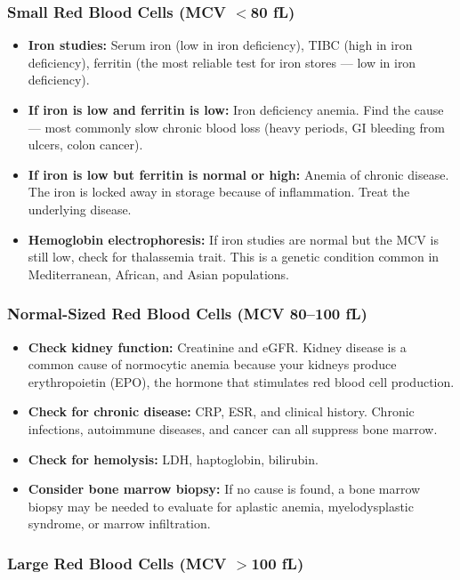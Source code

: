 \subsubsection{Small Red Blood Cells (MCV $<$80 fL)}

\begin{itemize}
    \item \textbf{Iron studies:} Serum iron (low in iron deficiency), TIBC (high in iron deficiency), ferritin (the most reliable test for iron stores --- low in iron deficiency).
    \item \textbf{If iron is low and ferritin is low:} Iron deficiency anemia. Find the cause --- most commonly slow chronic blood loss (heavy periods, GI bleeding from ulcers, colon cancer).
    \item \textbf{If iron is low but ferritin is normal or high:} Anemia of chronic disease. The iron is locked away in storage because of inflammation. Treat the underlying disease.
    \item \textbf{Hemoglobin electrophoresis:} If iron studies are normal but the MCV is still low, check for thalassemia trait. This is a genetic condition common in Mediterranean, African, and Asian populations.
\end{itemize}

\subsubsection{Normal-Sized Red Blood Cells (MCV 80--100 fL)}

\begin{itemize}
    \item \textbf{Check kidney function:} Creatinine and eGFR. Kidney disease is a common cause of normocytic anemia because your kidneys produce erythropoietin (EPO), the hormone that stimulates red blood cell production.
    \item \textbf{Check for chronic disease:} CRP, ESR, and clinical history. Chronic infections, autoimmune diseases, and cancer can all suppress bone marrow.
    \item \textbf{Check for hemolysis:} LDH, haptoglobin, bilirubin.
    \item \textbf{Consider bone marrow biopsy:} If no cause is found, a bone marrow biopsy may be needed to evaluate for aplastic anemia, myelodysplastic syndrome, or marrow infiltration.
\end{itemize}

\subsubsection{Large Red Blood Cells (MCV $>$100 fL)}

